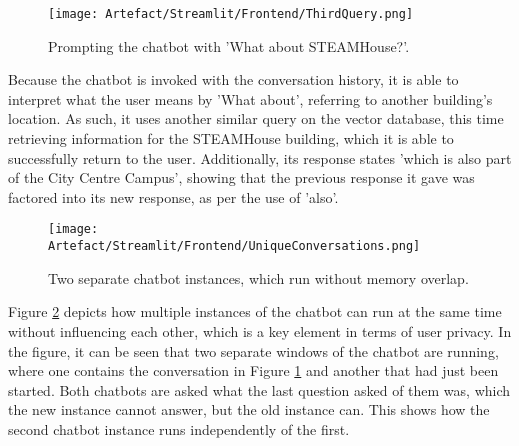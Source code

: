 \begin{figure}[H]
    \centering
    \texttt{[image: Artefact/Streamlit/Frontend/ThirdQuery.png]}
    \caption{Prompting the chatbot with 'What about STEAMHouse?'. \label{fig:ThirdQuery}}
\end{figure}

\noindent Because the chatbot is invoked with the conversation history, it is able to interpret what the user means by 'What about', 
referring to another building's location. As such, it uses another similar query on the vector database, this time retrieving information 
for the STEAMHouse building, which it is able to successfully return to the user. Additionally, its response states 'which is also part of 
the City Centre Campus', showing that the previous response it gave was factored into its new response, as per the use of 'also'.

\begin{figure}[H]
    \centering
    \texttt{[image: Artefact/Streamlit/Frontend/UniqueConversations.png]}
    \caption{Two separate chatbot instances, which run without memory overlap. \label{fig:UniqueConversations}}
\end{figure}

\noindent Figure \ref{fig:UniqueConversations} depicts how multiple instances of the chatbot can run at the same time without influencing 
each other, which is a key element in terms of user privacy. In the figure, it can be seen that two separate windows of the chatbot are 
running, where one contains the conversation in Figure \ref{fig:ThirdQuery} and another that had just been started. Both chatbots are 
asked what the last question asked of them was, which the new instance cannot answer, but the old instance can. This shows how the second 
chatbot instance runs independently of the first.

